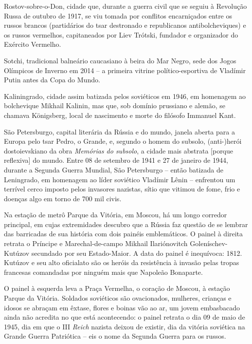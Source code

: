 Rostov-sobre-o-Don, cidade que, durante a guerra civil que se seguiu à
Revolução Russa de outubro de 1917, se viu tomada por conflitos
encarniçados entre os russos brancos (partidários do tsar destronado e
republicanos antibolcheviques) e os russos vermelhos, capitaneados por
Liev Trótski, fundador e organizador do Exército Vermelho.

Sotchi, tradicional balneário caucasiano à beira do Mar Negro, sede dos
Jogos Olímpicos de Inverno em 2014 -- a primeira vitrine
político-esportiva de Vladímir Putin antes da Copa do Mundo.

Kaliningrado, cidade assim batizada pelos soviéticos em 1946, em
homenagem ao bolchevique Mikhail Kalinin, mas que, sob domínio prussiano
e alemão, se chamava Königsberg, local de nascimento e morte do filósofo
Immanuel Kant.

São Petersburgo, capital literária da Rússia e do mundo, janela aberta
para a Europa pelo tsar Pedro, o Grande, e, segundo o homem do subsolo,
(anti-)herói dostoievskiano da obra \emph{Memórias do subsolo}, a cidade
mais abstrata {[}porque reflexiva{]} do mundo. Entre 08 de setembro de
1941 e 27 de janeiro de 1944, durante a Segunda Guerra Mundial, São
Petersburgo -- então batizada de Leningrado, em homenagem ao líder
soviético Vladímir Lênin -- enfrentou um terrível cerco imposto pelos
invasores nazistas, sítio que vitimou de fome, frio e doenças algo em
torno de 700 mil civis.

Na estação de metrô Parque da Vitória, em Moscou, há um longo corredor
principal, em cujas extremidades descubro que a Rússia faz questão de se
lembrar das barricadas de sua história com dois painéis emblemáticos. O
painel à direita retrata o Príncipe e Marechal-de-campo Mikhail
Ilariónovitch Goleníschev-Kutúzov secundado por seu Estado-Maior. A data
do painel é inequívoca: 1812. Kutúzov e seu alto oficialato são os
heróis da resistência à invasão pelas tropas francesas comandadas por
ninguém mais que Napoleão Bonaparte.

O painel à esquerda leva a Praça Vermelha, o coração de Moscou, à
estação Parque da Vitória. Soldados soviéticos são ovacionados,
mulheres, crianças e idosos se abraçam em êxtase, flores e boinas vão ao
ar, um jovem embasbacado ainda não acredita no que está acontecendo: o
painel retrata o dia 09 de maio de 1945, dia em que o III \emph{Reich}
nazista deixou de existir, dia da vitória soviética na Grande Guerra
Patriótica -- eis o nome da Segunda Guerra para os russos.

